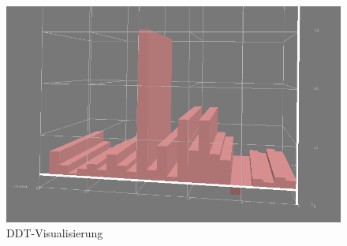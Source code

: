 \documentclass[12pt]{article}
\begin{document}
\begin{sloppypar}
\begin{figure}[htbp]
    \centering
    \caption{DDT-Visualisierung}
    \begin{minipage}[t]{1.0\textwidth}
        \includegraphics[width=\textwidth]{res/1darray-high-res.png}
    \end{minipage}
\end{figure}

\end{sloppypar}
\end{document}
